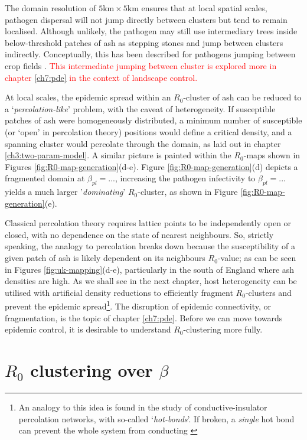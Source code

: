 The domain resolution of $5\mathrm{km} \times 5 \mathrm{km}$ ensures that at local spatial scales, pathogen dispersal will not jump directly between clusters but tend to remain localised. Although unlikely, the pathogen may still use intermediary trees inside below-threshold patches of ash as stepping stones and jump between clusters indirectly. Conceptually, this has been described for pathogens jumping between crop fields \cite{Gilligan-disease-management}. \textcolor{red}{This intermediate jumping between cluster is explored more in chapter \ref{ch7:pde} in the context of landscape control.}

At local scales, the epidemic spread within an $R_0$-cluster of ash can be reduced to a `\textit{percolation-like}' problem, with the caveat of heterogeneity. If susceptible patches of ash were homogeneously distributed, a minimum number of susceptible (or `open' in percolation theory) positions would define a critical density, and a spanning cluster would percolate through the domain, as laid out in chapter \ref{ch3:two-param-model}. A similar picture is painted within the $R_0$-maps shown in Figures \ref{fig:R0-map-generation}(d-e). Figure \ref{fig:R0-map-generation}(d) depicts a fragmented domain at $\beta_{pl}=...$, increasing the pathogen infectivity to $\beta_{pl}=...$ yields a much larger '\textit{dominating}' $R_0$-cluster, as shown in Figure \ref{fig:R0-map-generation}(e).

Classical percolation theory requires lattice points to be independently open or closed, with no dependence on the state of nearest neighbours. So, strictly speaking, the analogy to percolation breaks down because the susceptibility of a given patch of ash is likely dependent on its neighbours $R_0$-value; as can be seen in Figures \ref{fig:uk-mapping}(d-e), particularly in the south of England where ash densities are high. As we shall see in the next chapter, host heterogeneity can be utilised with artificial density reductions to efficiently fragment $R_0$-clusters and prevent the epidemic spread\footnote{An analogy to this idea is found in the study of conductive-insulator percolation networks, with so-called `\textit{hot-bonds}'. If broken, a \textit{single} hot bond can prevent the whole system from conducting \cite{RevModPhys.45.574, Herrmann_1984, hot-bond}}. The disruption of epidemic connectivity, or fragmentation, is the topic of chapter \ref{ch7:pde}. Before we can move towards epidemic control, it is desirable to understand $R_0$-clustering more fully.

\section{$R_0$ clustering over $\beta$}
\label{R0-over-beta}


